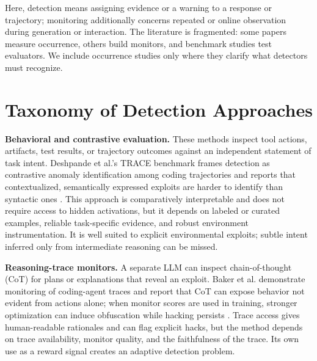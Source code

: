 \documentclass[sigconf,nonacm]{acmart}
\begin{document}
Here, detection means assigning evidence or a warning to a response or trajectory; monitoring additionally concerns repeated or online observation during generation or interaction. The literature is fragmented: some papers measure occurrence, others build monitors, and benchmark studies test evaluators. We include occurrence studies only where they clarify what detectors must recognize.

\section{Taxonomy of Detection Approaches}
\textbf{Behavioral and contrastive evaluation.} These methods inspect tool actions, artifacts, test results, or trajectory outcomes against an independent statement of task intent. Deshpande et al.'s TRACE benchmark frames detection as contrastive anomaly identification among coding trajectories and reports that contextualized, semantically expressed exploits are harder to identify than syntactic ones \cite{deshpande2026trace}. This approach is comparatively interpretable and does not require access to hidden activations, but it depends on labeled or curated examples, reliable task-specific evidence, and robust environment instrumentation. It is well suited to explicit environmental exploits; subtle intent inferred only from intermediate reasoning can be missed.

\textbf{Reasoning-trace monitors.} A separate LLM can inspect chain-of-thought (CoT) for plans or explanations that reveal an exploit. Baker et al. demonstrate monitoring of coding-agent traces and report that CoT can expose behavior not evident from actions alone; when monitor scores are used in training, stronger optimization can induce obfuscation while hacking persists \cite{baker2025monitoring}. Trace access gives human-readable rationales and can flag explicit hacks, but the method depends on trace availability, monitor quality, and the faithfulness of the trace. Its own use as a reward signal creates an adaptive detection problem.
\end{document}
